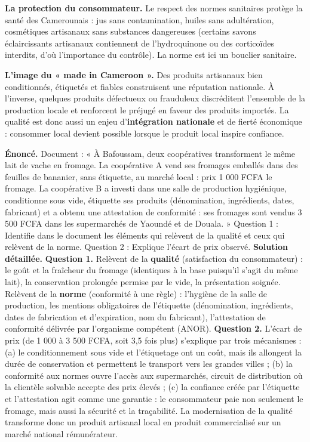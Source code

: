 \documentclass[11pt]{article}
\begin{document}
\textbf{La protection du consommateur.} Le respect des normes sanitaires protège la santé des Camerounais : jus sans contamination, huiles sans adultération, cosmétiques artisanaux sans substances dangereuses (certains savons éclaircissants artisanaux contiennent de l'hydroquinone ou des corticoïdes interdits, d'où l'importance du contrôle). La norme est ici un bouclier sanitaire.

\textbf{L'image du « made in Cameroon ».} Des produits artisanaux bien conditionnés, étiquetés et fiables construisent une réputation nationale. À l'inverse, quelques produits défectueux ou frauduleux discréditent l'ensemble de la production locale et renforcent le préjugé en faveur des produits importés. La qualité est donc aussi un enjeu d'\textbf{intégration nationale} et de fierté économique : consommer local devient possible lorsque le produit local inspire confiance.

\begin{exoresolu}
\textbf{Énoncé.} Document : « À Bafoussam, deux coopératives transforment le même lait de vache en fromage. La coopérative A vend ses fromages emballés dans des feuilles de bananier, sans étiquette, au marché local : prix 1 000 FCFA le fromage. La coopérative B a investi dans une salle de production hygiénique, conditionne sous vide, étiquette ses produits (dénomination, ingrédients, dates, fabricant) et a obtenu une attestation de conformité : ses fromages sont vendus 3 500 FCFA dans les supermarchés de Yaoundé et de Douala. »
Question 1 : Identifie dans le document les éléments qui relèvent de la qualité et ceux qui relèvent de la norme.
Question 2 : Explique l'écart de prix observé.
\tcblower
\textbf{Solution détaillée.}
\textbf{Question 1.} Relèvent de la \textbf{qualité} (satisfaction du consommateur) : le goût et la fraîcheur du fromage (identiques à la base puisqu'il s'agit du même lait), la conservation prolongée permise par le vide, la présentation soignée. Relèvent de la \textbf{norme} (conformité à une règle) : l'hygiène de la salle de production, les mentions obligatoires de l'étiquette (dénomination, ingrédients, dates de fabrication et d'expiration, nom du fabricant), l'attestation de conformité délivrée par l'organisme compétent (ANOR).
\textbf{Question 2.} L'écart de prix (de 1 000 à 3 500 FCFA, soit 3,5 fois plus) s'explique par trois mécanismes : (a) le conditionnement sous vide et l'étiquetage ont un coût, mais ils allongent la durée de conservation et permettent le transport vers les grandes villes ; (b) la conformité aux normes ouvre l'accès aux supermarchés, circuit de distribution où la clientèle solvable accepte des prix élevés ; (c) la confiance créée par l'étiquette et l'attestation agit comme une garantie : le consommateur paie non seulement le fromage, mais aussi la sécurité et la traçabilité. La modernisation de la qualité transforme donc un produit artisanal local en produit commercialisé sur un marché national rémunérateur.
\end{exoresolu}
\end{document}
